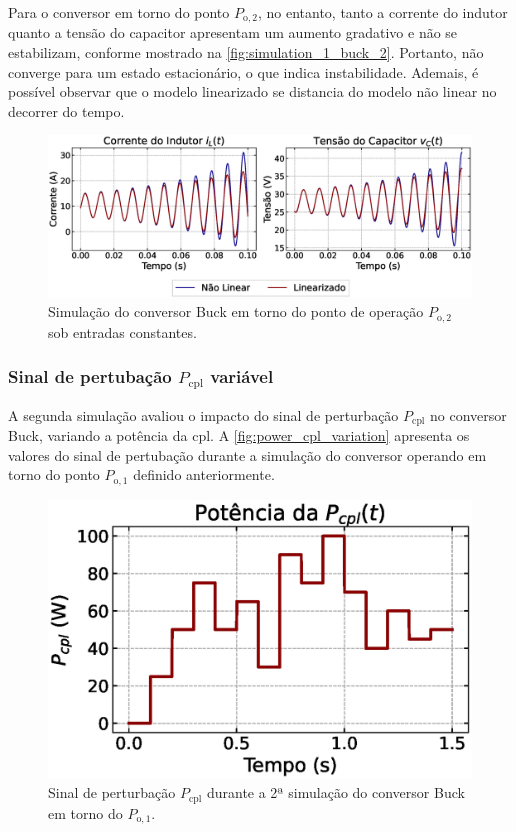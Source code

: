 Para o conversor em torno do ponto $P_{\mathrm{o}, 2}$, no entanto, tanto a corrente do indutor quanto a tensão do capacitor apresentam um aumento gradativo e não se estabilizam, conforme mostrado na \autoref{fig:simulation_1_buck_2}. Portanto, não converge para um estado estacionário, o que indica instabilidade. Ademais, é possível observar que o modelo linearizado se distancia do modelo não linear no decorrer do tempo.

\begin{figure}[H]
  \centering
  \captionsetup{justification=centering}
  \includegraphics[width=1.\textwidth]{figuras/buck/sim1/op2/result.eps}
  \caption{Simulação do conversor Buck em torno do ponto de operação $P_{\mathrm{o}, 2}$ sob entradas constantes.}
  \label{fig:simulation_1_buck_2}
\end{figure}

\subsubsection{Sinal de pertubação $P_{\textrm{cpl}}$ variável}

A segunda simulação avaliou o impacto do sinal de perturbação $P_{\mathrm{cpl}}$ no conversor Buck, variando a potência da \acrshort{cpl}. A \autoref{fig:power_cpl_variation} apresenta os valores do sinal de pertubação durante a simulação do conversor operando em torno do ponto $P_{\mathrm{o}, 1}$ definido anteriormente.

\begin{figure}[H]
  \centering
  \includegraphics[width=.5\textwidth]{figuras/buck/sim2/op1/power_cpl_variation.eps}
  \captionsetup{justification=centering}
  \caption{Sinal de perturbação $P_{\mathrm{cpl}}$ durante a 2ª simulação do conversor Buck em torno do $P_{\mathrm{o}, 1}$.}
  \label{fig:power_cpl_variation}
\end{figure}

